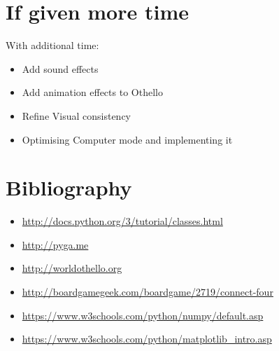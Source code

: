 \documentclass[12pt,a4paper]{article}
\begin{document}
\section{If given more time}
With additional time:
\begin{itemize}
    \item Add sound effects
    \item Add animation effects to Othello
    \item Refine Visual consistency
    \item Optimising Computer mode and implementing it
\end{itemize}
\vfill

\section{Bibliography}
\begin{itemize}
    \item \url{http://docs.python.org/3/tutorial/classes.html}
    \item \url{http://pyga.me}
    \item \url{http://worldothello.org}
    \item \url{http://boardgamegeek.com/boardgame/2719/connect-four}
    \item \url{https://www.w3schools.com/python/numpy/default.asp}
    \item \url{https://www.w3schools.com/python/matplotlib_intro.asp}
\end{itemize}
\end{document}
